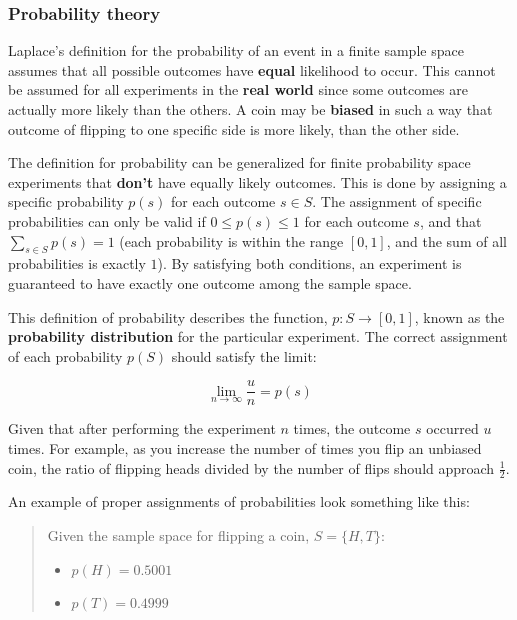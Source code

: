 \hypertarget{probability-theory}{%
\subsubsection{Probability theory}\label{probability-theory}}

Laplace's definition for the probability of an event in a finite sample
space assumes that all possible outcomes have \textbf{equal} likelihood
to occur. This cannot be assumed for all experiments in the \textbf{real
world} since some outcomes are actually more likely than the others. A
coin may be \textbf{biased} in such a way that outcome of flipping to
one specific side is more likely, than the other side.

The definition for probability can be generalized for finite probability
space experiments that \textbf{don't} have equally likely outcomes. This
is done by assigning a specific probability \textbf{\(p(s)\)} for each
outcome \textbf{\(s \in S\)}. The assignment of specific probabilities
can only be valid if \textbf{\(0 \leq p(s) \leq 1\)} for each outcome
\textbf{\(s\)}, and that \textbf{\(\sum_{s \in S}{p(s)}=1\)} (each
probability is within the range \textbf{\([0,1]\)}, and the sum of all
probabilities is exactly \textbf{\(1\)}). By satisfying both conditions,
an experiment is guaranteed to have exactly one outcome among the sample
space.

This definition of probability describes the function,
\textbf{\(p:S\to [0,1]\)}, known as the \textbf{probability
distribution} for the particular experiment. The correct assignment of
each probability \textbf{\(p(S)\)} should satisfy the limit:

\[
\lim_{n\to \infty}{\frac{u}{n}}=p(s)
\]

Given that after performing the experiment \textbf{\(n\)} times, the
outcome \textbf{\(s\)} occurred \textbf{\(u\)} times. For example, as
you increase the number of times you flip an unbiased coin, the ratio of
flipping heads divided by the number of flips should approach
\textbf{\(\frac{1}{2}\)}.

An example of proper assignments of probabilities look something like
this:

\begin{quote}
Given the sample space for flipping a coin, \textbf{\(S=\{H,T\}\)}:

\begin{itemize}
\tightlist
\item
  \textbf{\(p(H)=0.5001\)}
\item
  \(p(T)=0.4999\)
\end{itemize}
\end{quote}

